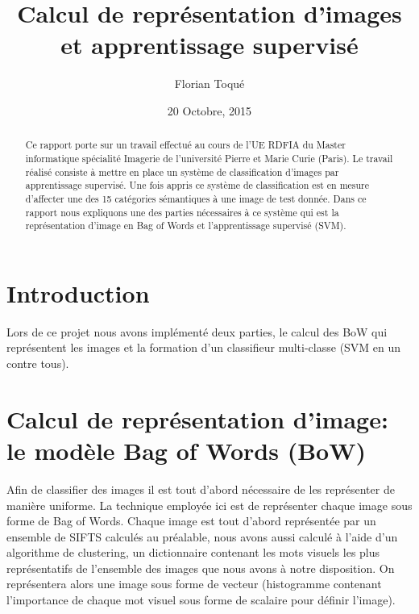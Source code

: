 \documentclass[a4paper]{article}
\author{Florian Toqué}
\date{20 Octobre, 2015}
\title{Calcul de représentation d'images et apprentissage supervisé\\}
\begin{document}
\maketitle



\begin{abstract}


Ce rapport porte sur un travail effectué au cours de l'UE RDFIA du Master informatique spécialité Imagerie de l'université Pierre et Marie Curie (Paris). Le travail réalisé consiste à mettre en place un système de classification d’images par apprentissage supervisé. Une fois appris ce système de classification est en mesure d’affecter une des 15 catégories sémantiques à une image de test donnée. Dans ce rapport nous expliquons une des parties nécessaires à ce système qui est la représentation d'image en Bag of Words et l'apprentissage supervisé (SVM). 
\end{abstract}
\newpage
\section{Introduction}
Lors de ce projet nous avons implémenté deux parties, le calcul des BoW qui représentent les images et la formation d'un classifieur multi-classe (SVM en un contre tous).


\section{Calcul de représentation d'image: le modèle Bag of Words (BoW)}
Afin de classifier des images il est tout d'abord nécessaire de les représenter de manière uniforme. La technique employée ici est de représenter chaque image sous forme de Bag of Words. Chaque image est tout d'abord représentée par un ensemble de SIFTS  calculés au préalable, nous avons aussi calculé à l'aide d'un algorithme de clustering, un dictionnaire contenant les mots visuels les plus représentatifs de l'ensemble des images que nous avons à notre disposition. On représentera alors une image sous forme de vecteur (histogramme contenant l'importance de chaque mot visuel sous forme de scalaire pour définir l'image). 
\end{document}

